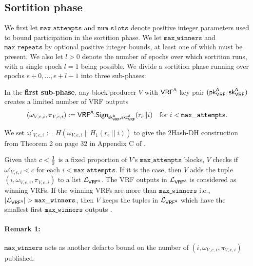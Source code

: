 \subsection{Sortition phase}\label{subsec:sortition_phase}
\newcommand{\vrfaattemptsbound}{\mathtt{max\_attempts}} %
\newcommand{\vrfawinnersbound}{\mathtt{max\_winners}} %
\newcommand{\vrfarepeatbound}{\mathtt{max\_repeats}} %
\newcommand{\vrfaslotsbound}{\mathtt{num\_slots}} %
\newcommand{\vrfwinninglist}{\ensuremath{\mathcal{L}_{\VRFa}}} %

We first let $\vrfaattemptsbound$ and $\vrfaslotsbound$ denote positive integer parameters used to bound participation in the sortition phase.  We let $\vrfawinnersbound$ and $\vrfarepeatbound$ by optional positive integer bounds, at least one of which must be present.  We also let $l>0$ denote the number of epochs over which sortition runs, with a single epoch $l=1$ being possible.  We divide a sortition phase running over epochs $e+0,\ldots,e+l-1$ into three sub-phases:  

In the {\bf first sub-phase}, any block producer $V$ with $\mathsf{VRF}^{\mathsf{A}}$ key pair $(\mathsf{pk}_{\mathsf{VRF}}^{\mathsf{A}},\mathsf{sk}_{\mathsf{VRF}}^{\mathsf{A}})$ creates a limited number of VRF outputs 
$$ (\omega_{V,e,i},\pi_{V,e,i}) := \VRFa.\Sign_{\skvrfa,\skcvrfa}(r_e \| i) \quad \text{for $i < \vrfaattemptsbound$.} $$

We set $\omega'_{V,e,i} := H(\omega_{V,e,i} \| H_1(r_e \| i))$ to give the 2Hash-DH construction from Theorem 2 on page 32 in Appendix C of \cite{Praos}.  

Given that  $c < {1\over2}$ is a fixed proportion of $V$'s $\vrfaattemptsbound$ blocks, $ V $ checks if  $\omega'_{V,e,i} < c$  for each $ i < \vrfaattemptsbound $. If it is the case, then $ V $ adds the tuple $ (i,\omega_{V,e,i},\pi_{V,e,i}) $ to a list $ \vrfwinninglist $.  The VRF outputs in $ \vrfwinninglist $ is considered as winning VRFs. If the winning VRFs are more than $ \vrfawinnersbound $ i.e.,$ |\vrfwinninglist| >  \vrfawinnersbound$, then $ V $ keeps the tuples in $ \vrfwinninglist $  which have the smallest first $ \vrfawinnersbound $ outputs .  

\paragraph{Remark 1:}  $\vrfawinnersbound$ acts as another defacto bound on the number of $(i,\omega_{V,e,i},\pi_{V,e,i})$ published. 
